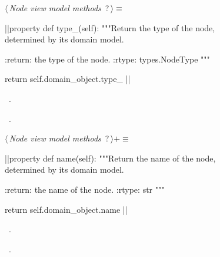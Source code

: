 \documentclass[%
    a4paper,    %
    justified,  %
    nobib,      %
    openany     %
]{tufte-book}
\makeatletter
\renewcommand{\label}[1]{\@tufte@label{##1}}%
\makeatother
\begin{document}
\begin{figure}
\begin{flushleft} \small
\begin{minipage}{\linewidth}\label{scrap70}\raggedright\small
{} $\langle\,${\itshape Node view model methods}\nobreak\ {\footnotesize {?}}$\,\rangle\equiv$
\vspace{-1ex}
\begin{pythoncode}
|\normalfont{}\fontfamily{}|property
def type_(self):
    """Return the type of the node, determined by its domain model.

    :return: the type of the node.
    :rtype: types.NodeType
    """

    return self.domain_object.type_
|\NWsep|
\end{pythoncode}
\vspace{1.5ex}
\footnotesize
\begin{list}{}{\setlength{\itemsep}{-\parsep}\setlength{\itemindent}{-\leftmargin}}
\item \NWtxtMacroDefBy\ .
\item \NWtxtMacroRefIn\ .

\item{}
\end{list}
\end{minipage}\vspace{4ex}
\end{flushleft}
\begin{flushleft} \small
\begin{minipage}{\linewidth}\label{scrap71}\raggedright\small
{} $\langle\,${\itshape Node view model methods}\nobreak\ {\footnotesize {?}}$\,\rangle+\equiv$
\vspace{-1ex}
\begin{pythoncode}
|\normalfont{}\fontfamily{}|property
def name(self):
    """Return the name of the node, determined by its domain model.

    :return: the name of the node.
    :rtype: str
    """

    return self.domain_object.name
|\NWsep|
\end{pythoncode}
\vspace{1.5ex}
\footnotesize
\begin{list}{}{\setlength{\itemsep}{-\parsep}\setlength{\itemindent}{-\leftmargin}}
\item \NWtxtMacroDefBy\ .
\item \NWtxtMacroRefIn\ .


\end{list}
\end{minipage}
\end{flushleft}
\end{figure}
\end{document}
